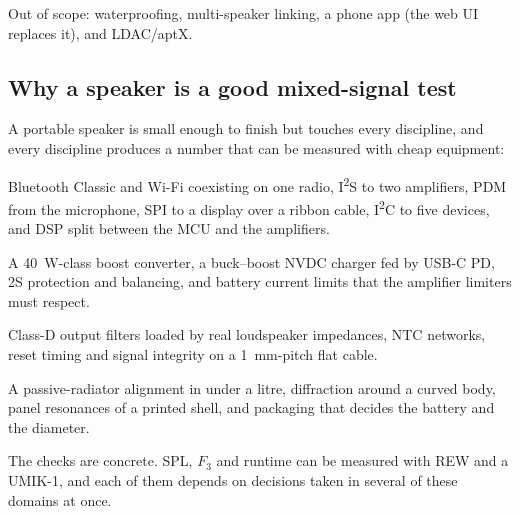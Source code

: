 Out of scope: waterproofing, multi-speaker linking, a phone app (the web UI replaces it), and LDAC/aptX.

\subsection{Why a speaker is a good mixed-signal test}

A portable speaker is small enough to finish but touches every discipline, and every discipline produces a number that can be measured with cheap equipment:

\begin{description}[style=nextline,leftmargin=1.2em]
  \item[Digital and RF] Bluetooth Classic and Wi-Fi coexisting on one radio, I\textsuperscript{2}S to two amplifiers, PDM from the microphone, SPI to a display over a ribbon cable, I\textsuperscript{2}C to five devices, and DSP split between the MCU and the amplifiers.
  \item[Power] A \qty{40}{\watt}-class boost converter, a buck--boost NVDC charger fed by USB-C PD, 2S protection and balancing, and battery current limits that the amplifier limiters must respect.
  \item[Analog] Class-D output filters loaded by real loudspeaker impedances, NTC networks, reset timing and signal integrity on a \qty{1}{\milli\metre}-pitch flat cable.
  \item[Acoustics and mechanics] A passive-radiator alignment in under a litre, diffraction around a curved body, panel resonances of a printed shell, and packaging that decides the battery and the diameter.
\end{description}

The checks are concrete. SPL, $F_3$ and runtime can be measured with REW and a UMIK-1, and each of them depends on decisions taken in several of these domains at once.
